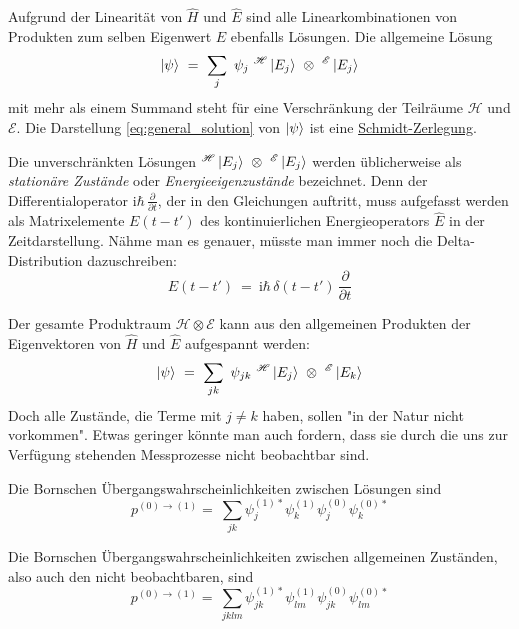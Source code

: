\documentclass[12pt]{article}
\begin{document}
Aufgrund der Linearität von $\hat{H}$ und $\hat{E}$ sind alle Linearkombinationen von Produkten zum selben Eigenwert $E$ ebenfalls Lösungen. Die allgemeine Lösung
\begin{equation}
\label{eq:general_solution}
\ket{\psi}\ =\ \sum_j\ \psi_j\ ^\mathscr{H}\ket{E_j}\ \otimes\ ^\mathscr{E}\ket{E_j}
\end{equation}
mit mehr als einem Summand steht für eine Verschränkung der Teilräume $\mathscr{H}$ und $\mathscr{E}$. Die Darstellung \eqref{eq:general_solution} von $\ket{\psi}$ ist eine \href{https://en.wikipedia.org/wiki/Schmidt_decomposition}{Schmidt-Zerlegung}.

Die unverschränkten Lösungen $^\mathscr{H}\ket{E_j}\ \otimes\ ^\mathscr{E}\ket{E_j}$ werden üblicherweise als \emph{stationäre Zustände} oder \emph{Energieeigenzustände} bezeichnet. Denn der Differentialoperator $\mathrm{i}\hbar\,\frac{\partial}{\partial t}$, der in den Gleichungen auftritt, muss aufgefasst werden als Matrixelemente $E(t-t')$ des kontinuierlichen Energieoperators $\hat{E}$ in der Zeitdarstellung. Nähme man es genauer, müsste man immer noch die Delta-Distribution dazuschreiben: 
\begin{equation*}
E(t-t')\ =\ \mathrm{i}\hbar\,\delta(t-t')\,\frac{\partial}{\partial t}
\end{equation*}

Der gesamte Produktraum $\mathscr{H} \otimes \mathscr{E}$ kann aus den allgemeinen Produkten der Eigenvektoren von $\hat{H}$ und $\hat{E}$ aufgespannt werden:
\begin{equation}
\label{eq:general_state}
\ket{\psi}\ =\ \sum_{jk}\ \psi_{jk}\ ^\mathscr{H}\ket{E_j}\ \otimes\ ^\mathscr{E}\ket{E_k}
\end{equation}
Doch alle Zustände, die Terme mit $j \neq k$ haben, sollen "in der Natur nicht vorkommen". Etwas geringer könnte man auch fordern, dass sie durch die uns zur Verfügung stehenden Messprozesse nicht beobachtbar sind.

Die Bornschen Übergangswahrscheinlichkeiten zwischen Lösungen sind
\begin{equation} 
p^{(0)\rightarrow(1)} =\ \sum_{jk} \psi_j^{(1)*}\psi_k^{(1)}\psi_j^{(0)}\psi_k^{(0)*}
\end{equation}

Die Bornschen Übergangswahrscheinlichkeiten zwischen allgemeinen Zuständen, also auch den nicht beobachtbaren, sind
\begin{equation} 
p^{(0)\rightarrow(1)} =\ \sum_{jklm} \psi_{jk}^{(1)*}\psi_{lm}^{(1)}\psi_{jk}^{(0)}\psi_{lm}^{(0)*}
\end{equation}
\end{document}
